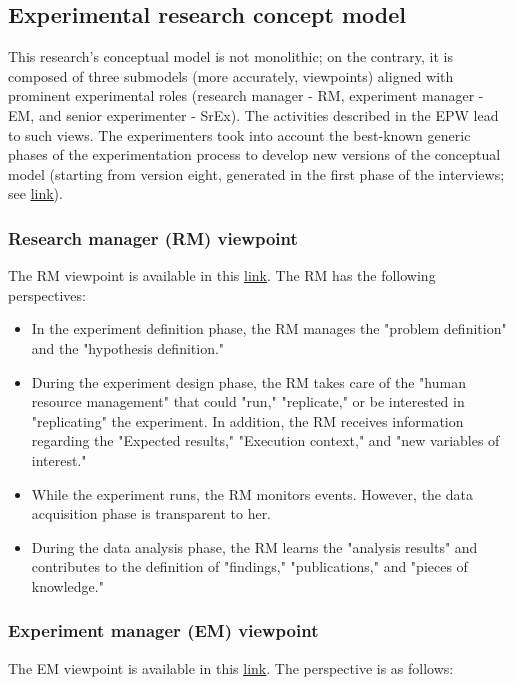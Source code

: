 \subsection{Experimental research concept model}
This research's conceptual model is not monolithic; on the contrary, it is composed of three submodels (more accurately, viewpoints) aligned with prominent experimental roles (research manager - RM, experiment manager - EM, and senior experimenter - SrEx). The activities described in the EPW lead to such views. The experimenters took into account the best-known generic phases of the experimentation process to develop new versions of the conceptual model (starting from version eight, generated in the first phase of the interviews; see \href{https://zenodo.org/record/7102387#.Yyt7W-zMLUI}{\ul{link}}).

\subsubsection{Research manager (RM) viewpoint}
The RM viewpoint is available in this \href{https://zenodo.org/record/7102431#.Yyxi1ezMLUJ}{\ul{link}}. The RM has the following perspectives:
\begin{itemize}
	\item In the experiment definition phase, the RM manages the "problem definition" and the "hypothesis definition." 
	\item During the experiment design phase, the RM takes care of the "human resource management" that could "run," "replicate," or be interested in "replicating" the experiment. In addition, the RM receives information regarding the "Expected results," "Execution context," and "new variables of interest."
	\item While the experiment runs, the RM monitors events. However, the data acquisition phase is transparent to her.
	\item During the data analysis phase, the RM learns the "analysis results" and contributes to the definition of "findings," "publications," and "pieces of knowledge."
\end{itemize}

\subsubsection{Experiment manager (EM) viewpoint}
The EM viewpoint is available in this \href{https://zenodo.org/record/7102450#.YyxjmezMLUJ}{\ul{link}}. The perspective is as follows:


